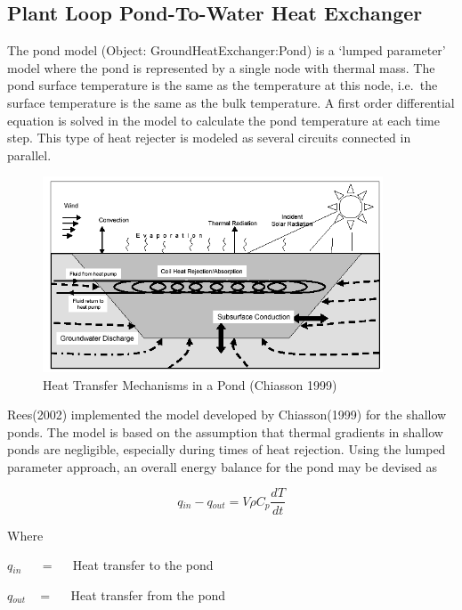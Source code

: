 \subsection{Plant Loop Pond-To-Water Heat Exchanger}\label{plant-loop-pond-to-water-heat-exchanger}

The pond model (Object: GroundHeatExchanger:Pond) is a `lumped parameter' model where the pond is represented by a single node with thermal mass. The pond surface temperature is the same as the temperature at this node, i.e.~the surface temperature is the same as the bulk temperature. A first order differential equation is solved in the model to calculate the pond temperature at each time step. This type of heat rejecter is modeled as several circuits connected in parallel.

\begin{figure}[hbtp] %
\centering
\includegraphics[width=0.9\textwidth, height=0.9\textheight, keepaspectratio=true]{media/image5676.png}
\caption{  Heat Transfer Mechanisms in a Pond (Chiasson 1999) \protect \label{fig:heat-transfer-mechanisms-in-a-pond-chiasson}}
\end{figure}

Rees(2002) implemented the model developed by Chiasson(1999) for the shallow ponds. The model is based on the assumption that thermal gradients in shallow ponds are negligible, especially during times of heat rejection. Using the lumped parameter approach, an overall energy balance for the pond may be devised as

\begin{equation}
q{}_{in} - q{}_{out} = V\rho C{}_p\frac{{dT}}{{dt}}
\end{equation}

Where

\(q{}_{in}\) ~~ = ~~ Heat transfer to the pond

\(q{}_{out}\) ~ = ~~ Heat transfer from the pond

